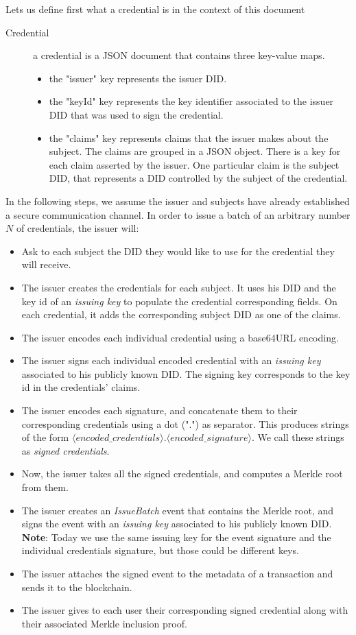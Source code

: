 \documentclass[10pt,a4paper]{article}
\begin{document}
Lets us define first what a credential is in the context of this document

\begin{description}
\item[Credential] a credential is a JSON document that contains three key-value maps.
 \begin{itemize}
 \item the "issuer" key represents the issuer DID.
 \item the "keyId" key represents the key identifier associated to the issuer DID that was used to sign the credential.
 \item the "claims" key represents claims that the issuer makes about the subject. The claims are grouped in a JSON object.
       There is a key for each claim asserted by the issuer. One particular claim is the subject DID, that represents a DID
       controlled by the subject of the credential.
 \end{itemize}
\end{description}

In the following steps, we assume the issuer and subjects have already established a secure communication channel.
In order to issue a batch of an arbitrary number $N$ of credentials, the issuer will:
\begin{itemize}
\item Ask to each subject the DID they would like to use for the credential they will receive.
\item The issuer creates the credentials for each subject. It uses his DID and the key id of an \emph{issuing key} to populate
      the credential corresponding fields. On each credential, it adds the corresponding subject DID as one of the claims.
\item The issuer encodes each individual credential using a base64URL encoding.
\item The issuer signs each individual encoded credential with an \emph{issuing key} associated to his publicly known DID. 
      The signing key corresponds to the key id in the credentials' claims.
\item The issuer encodes each signature, and concatenate them to their corresponding credentials using a dot (".") as separator.
      This produces strings of the form $\langle{}encoded\_credentials\rangle{}.\langle{}encoded\_signature\rangle{}$. We call these strings as \emph{signed credentials}.
\item Now, the issuer takes all the signed credentials, and computes a Merkle root from them.
\item The issuer creates an \emph{IssueBatch} event that contains the Merkle root, and signs the event with an \emph{issuing key} associated to his publicly known DID. 
\textbf{Note}: Today we use the same issuing key for the event signature and the individual credentials signature, but those could be different keys.
\item The issuer attaches the signed event to the metadata of a transaction and sends it to the blockchain.
\item The issuer gives to each user their corresponding signed credential along with their associated Merkle inclusion proof.
\end{itemize}
\end{document}
